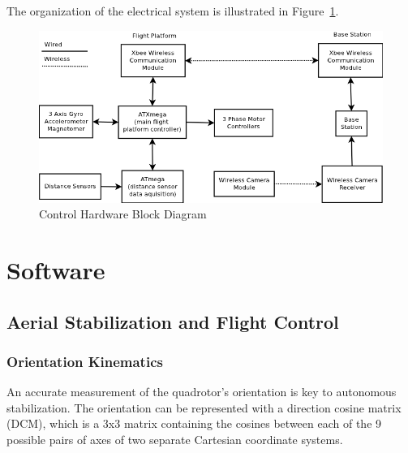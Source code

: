 \documentclass[12pt,letterpaper]{article}
\begin{document}
The organization of the electrical system is illustrated in
Figure~\ref{fig:el_blockdia}.

\begin{figure}[h!]
    \centering
    \includegraphics[width=6in]{controlhardware.png}
    \caption{Control Hardware Block Diagram}
    \label{fig:el_blockdia}
\end{figure}


\section*{Software}

\subsection*{Aerial Stabilization and Flight Control}


\subsubsection*{Orientation Kinematics}

An accurate measurement of the quadrotor's orientation is key to autonomous
stabilization. The orientation can be represented with a direction cosine
matrix (DCM), which is a 3x3 matrix containing the cosines between each of the
9 possible pairs of axes of two separate Cartesian coordinate systems.
\end{document}
